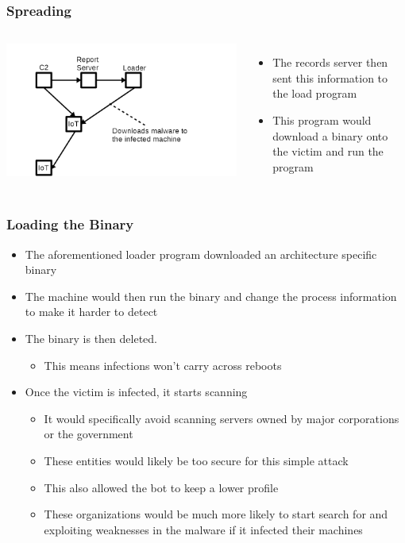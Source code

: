 \documentclass{beamer}
\begin{document}
\begin{frame}
	\frametitle{Spreading}
	\begin{columns}
			\includegraphics[width=\textwidth]{fig3.png}
			\begin{itemize}
				\item The records server then sent this information to the load program
				\item This program would download a binary onto the victim and run the program
			\end{itemize}
	\end{columns}
\end{frame}

\begin{frame}
	\frametitle{Loading the Binary}
	\begin{itemize}
		\item The aforementioned loader program downloaded an architecture specific binary
		\item The machine would then run the binary and change the process information to make it harder to detect
		\item The binary is then deleted.
		\begin{itemize}
			\item This means infections won't carry across reboots
		\end{itemize}
		\item Once the victim is infected, it starts scanning
		\begin{itemize}
			\item It would specifically avoid scanning servers owned by major corporations or the government
			\item These entities would likely be too secure for this simple attack
			\item This also allowed the bot to keep a lower profile
			\item These organizations would be much more likely to start search for and exploiting weaknesses in the malware if it infected their machines
		\end{itemize}
	\end{itemize}
\end{frame}
\end{document}

